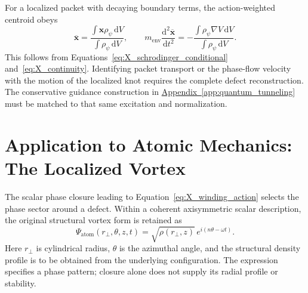 For a localized packet with decaying boundary terms, the action-weighted centroid obeys
\begin{equation}
    \overline{\mathbf x}
    =\frac{\int\mathbf x\rho_\psi\,\mathrm dV}
    {\int\rho_\psi\,\mathrm dV},
    \qquad
    m_{\mathrm{env}}\frac{\mathrm d^2\overline{\mathbf x}}{\mathrm dt^2}
    =-\frac{\int\rho_\psi\nabla V\,\mathrm dV}
    {\int\rho_\psi\,\mathrm dV}.
\end{equation}
This follows from Equations~\eqref{eq:X_schrodinger_conditional} and~\eqref{eq:X_continuity}. Identifying packet transport or the phase-flow velocity with the motion of the localized knot requires the complete defect reconstruction. The conservative guidance construction in \hyperref[app:quantum_tunneling]{Appendix~\ref*{app:quantum_tunneling}} must be matched to that same excitation and normalization.

\section{Application to Atomic Mechanics: The Localized Vortex}

The scalar phase closure leading to Equation~\eqref{eq:X_winding_action} selects the phase sector around a defect. Within a coherent axisymmetric scalar description, the original structural vortex form is retained as
\begin{equation}
    \Psi_{\mathrm{atom}}(r_\perp,\theta,z,t)
    =\sqrt{\rho(r_\perp,z)}\,e^{i(n\theta-\omega t)}.
\end{equation}
Here $r_\perp$ is cylindrical radius, $\theta$ is the azimuthal angle, and the structural density profile is to be obtained from the underlying configuration. The expression specifies a phase pattern; closure alone does not supply its radial profile or stability.

